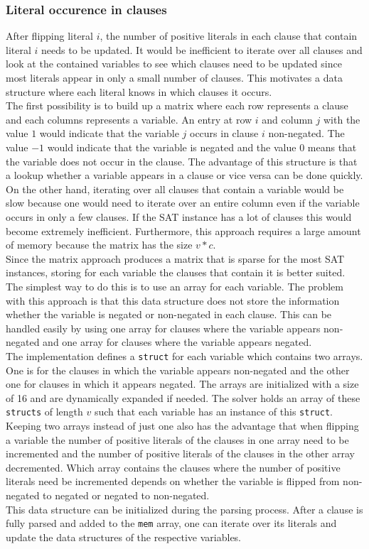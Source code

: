 \documentclass[12pt,a4paper]{article}
\begin{document}
\subsubsection{Literal occurence in clauses}
After flipping literal $i$, the number of positive literals in each clause that contain literal $i$ needs to be updated. It would be inefficient to iterate over all clauses and look at the contained variables to see which clauses need to be updated since most literals appear in only a small number of clauses. This motivates a data structure where each literal knows in which clauses it occurs.\\
The first possibility is to build up a matrix where each row represents a clause and each columns represents a variable. An entry at row $i$ and column $j$ with the value $1$ would indicate that the variable $j$ occurs in clause $i$ non-negated. The value $-1$ would indicate that the variable is negated and the value $0$ means that the variable does not occur in the clause. The advantage of this structure is that a lookup whether a variable appears in a clause or vice versa can be done quickly. On the other hand, iterating over all clauses that contain a variable would be slow because one would need to iterate over an entire column even if the variable occurs in only a few clauses. If the SAT instance has a lot of clauses this would become extremely inefficient. Furthermore, this approach requires a large amount of memory because the matrix has the size $v*c$.\\
Since the matrix approach produces a matrix that is sparse for the most SAT instances, storing for each variable the clauses that contain it is better suited. The simplest way to do this is to use an array for each variable. The problem with this approach is that this data structure does not store the information whether the variable is negated or non-negated in each clause. This can be handled easily by using one array for clauses where the variable appears non-negated and one array for clauses where the variable appears negated.\\
The implementation defines a \texttt{struct} for each variable which contains two arrays. One is for the clauses in which the variable appears non-negated and the other one for clauses in which it appears negated. The arrays are initialized with a size of 16 and are dynamically expanded if needed. The solver holds an array of these \texttt{structs} of length $v$ such that each variable has an instance of this \texttt{struct}.\\
Keeping two arrays instead of just one also has the advantage that when flipping a variable the number of positive literals of the clauses in one array need to be incremented and the number of positive literals of the clauses in the other array decremented. Which array contains the clauses where the number of positive literals need be incremented depends on whether the variable is flipped from non-negated to negated or negated to non-negated.\\
This data structure can be initialized during the parsing process. After a clause is fully parsed and added to the \texttt{mem} array, one can iterate over its literals and update the data structures of the respective variables.
\end{document}
